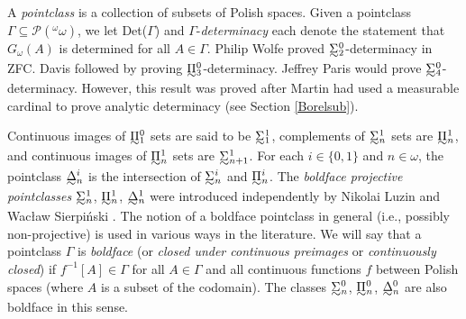 \documentclass{book}%
\newcommand{\breals}{{^{\omega}}\omega}
\def\underTilde#1{{\baselineskip=0pt\vtop{\hbox{$#1$}\hbox{$\sim$}}}{}}
\newcommand{\uTPi}{\underTilde{\Pi}}
\newcommand{\uTSigma}{\underTilde{\Sigma}}
\newcommand{\uTDelta}{\underTilde{\Delta}}
\begin{document}
A \emph{pointclass} is a collection of subsets of Polish spaces.
Given a pointclass $\Gamma \subseteq \mathcal{P}(\breals)$, we let Det($\Gamma$) and
$\Gamma$-\emph{determinacy} each denote
the statement that $G_{\omega}(A)$ is determined for all $A \in \Gamma$.
Philip Wolfe
 proved $\uTSigma^{0}_{2}$-determinacy in ZFC. Davis  followed by proving $\uTPi^{0}_{3}$-determinacy. Jeffrey Paris  would prove $\uTSigma^{0}_{4}$-determinacy.
However, this result was proved after Martin had used a measurable cardinal to prove analytic determinacy
(see Section \ref{Borelsub}).





Continuous images of
$\uTPi^{0}_{1}$ sets are said to be
$\uTSigma^{1}_{1}$, complements of
$\uTSigma^{1}_{n}$ sets are
$\uTPi^{1}_{n}$,%
and continuous images of $\uTPi^{1}_{n}$ sets are
$\uTSigma^{1}_{n+1}$. For each $i \in \{0,1\}$ and $n \in
\omega$, the pointclass $\underTilde{\Delta}^{i}_{n}$ is the intersection of
$\uTSigma^{i}_{n}$ and $\uTPi^{i}_{n}$. The \emph{boldface projective
pointclasses}
$\uTSigma^{1}_{n}$,
$\uTPi^{1}_{n}$, $\uTDelta^{1}_{n}$ were introduced independently by
Nikolai Luzin  and Wac{\l}aw Sierpi\'{n}ski
. The notion of a boldface pointclass in general (i.e., possibly non-projective) is used in
various ways in the literature. We will say that a pointclass $\Gamma$ is \emph{boldface}
(or \emph{closed under continuous preimages}
or \emph{continuously closed})
 if $f^{-1}[A] \in \Gamma$ for all $A \in \Gamma$ and
all continuous functions $f$ between Polish spaces (where $A$ is a subset of the codomain).
The classes $\uTSigma^{0}_{n}$,
$\uTPi^{0}_{n}$, $\uTDelta^{0}_{n}$ are also boldface in this sense.
\end{document}
